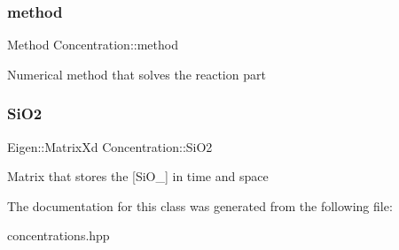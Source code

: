 \subsubsection{\texorpdfstring{method}{method}}
{\footnotesize\ttfamily Method Concentration\+::method\hspace{0.3cm}{\ttfamily [private]}}

Numerical method that solves the reaction part \mbox{\label{classConcentration_a2b06dc966fe05efd87ea6719a3666fb7}} 
\subsubsection{\texorpdfstring{Si\+O2}{SiO2}}
{\footnotesize\ttfamily Eigen\+::\+Matrix\+Xd Concentration\+::\+Si\+O2\hspace{0.3cm}{\ttfamily [private]}}

Matrix that stores the \mbox{[}Si\+O\+\_\mbox{]} in time and space 

The documentation for this class was generated from the following file\+:\begin{DoxyCompactItemize}
\item 
concentrations.\+hpp\end{DoxyCompactItemize}
